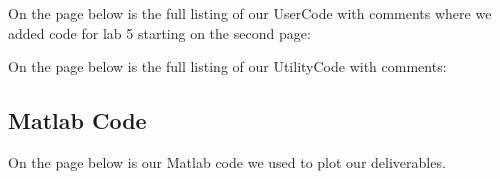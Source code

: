 \documentclass{article}
\begin{document}
On the page below is the full listing of our UserCode with comments where we added code for lab 5 starting on the second page:


On the page below is the full listing of our UtilityCode with comments:


\subsection{Matlab Code} 
On the page below is our Matlab code we used to plot our deliverables.

 
\end{document}
